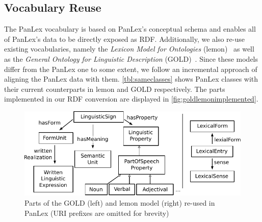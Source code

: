 \documentclass[sw]{iosart2c}
\begin{document}
\subsection{Vocabulary Reuse}
\label{sec:vocabulary-reuse}
The PanLex vocabulary is based on PanLex's conceptual schema and
enables all of PanLex's data to be directly exposed as RDF.
Additionally, we also re-use existing vocabularies, namely
the \emph{Lexicon Model for Ontologies} (lemon)~\cite{lemon2011} as well as the \emph{General Ontology for Linguistic Description} (GOLD)~\cite{farr2003}.
Since these models differ from the PanLex one to some extent, we follow an
incremental approach of aligning the PanLex data with them.
\autoref{tbl:sameclasses} shows PanLex classes with their current counterparts
in lemon and GOLD respectively.
The parts implemented in our RDF conversion are displayed in \autoref{fig:goldlemonimplemented}.
\begin{figure}
  \centering
  \includegraphics[width=\linewidth]{images/pdf/gold_lemon_implemented.pdf}
  \caption{Parts of the GOLD (left) and lemon model (right) re-used in PanLex (URI prefixes are omitted for brevity)}
  \label{fig:goldlemonimplemented}
\end{figure}
\end{document}
